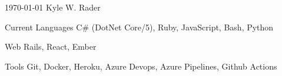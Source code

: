 \documentclass[11pt, a4paper]{awesome-cv}
\begin{document}
\makecvheader

\makecvfooter
  {\today}
  {Kyle W. Rader}
  {\thepage}

\begin{cvskills}
  \cvskill
    {Current Languages} %
    {C\# (DotNet Core/5), Ruby, JavaScript, Bash, Python} %

  \cvskill
    {Web} %
    {Rails, React, Ember} %

  \cvskill
    {Tools} %
    {Git, Docker, Heroku, Azure Devops, Azure Pipelines, Github Actions} %
\end{cvskills}
\end{document}
